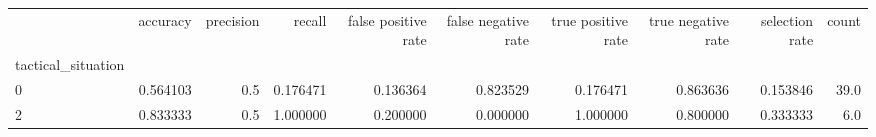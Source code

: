 \begin{tabular}{lrrrrrrrrr}
\toprule
{} &  accuracy &  precision &    recall &  false positive rate &  false negative rate &  true positive rate &  true negative rate &  selection rate &  count \\
tactical\_situation &           &            &           &                      &                      &                     &                     &                 &        \\
\midrule
0                  &  0.564103 &        0.5 &  0.176471 &             0.136364 &             0.823529 &            0.176471 &            0.863636 &        0.153846 &   39.0 \\
2                  &  0.833333 &        0.5 &  1.000000 &             0.200000 &             0.000000 &            1.000000 &            0.800000 &        0.333333 &    6.0 \\
\bottomrule
\end{tabular}
